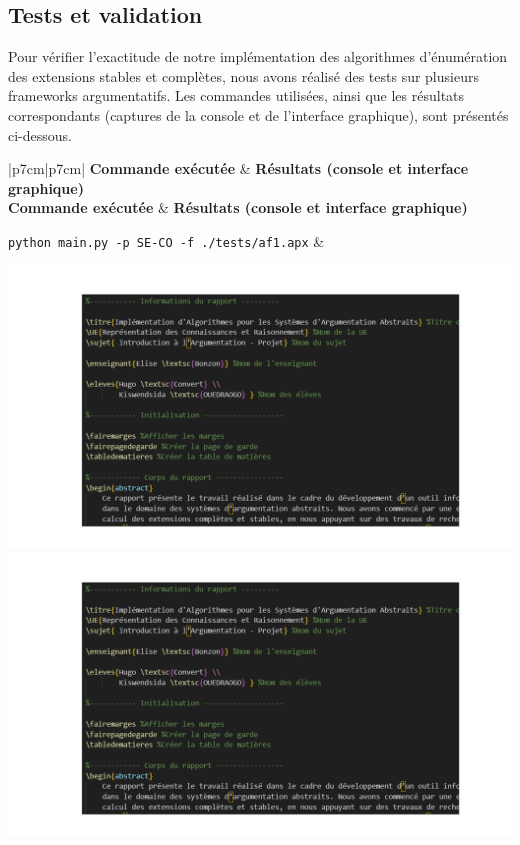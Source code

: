 \documentclass{rapportECL}
\begin{document}
\subsection{Tests et validation}

Pour vérifier l'exactitude de notre implémentation des algorithmes d'énumération des extensions stables et complètes, nous avons réalisé des tests sur plusieurs frameworks argumentatifs. Les commandes utilisées, ainsi que les résultats correspondants (captures de la console et de l'interface graphique), sont présentés ci-dessous.

\vspace{0.5cm}
\noindent


\begin{longtable}{|p{7cm}|p{7cm}|}
	\hline
	\textbf{Commande exécutée} & \textbf{Résultats (console et interface graphique)} \\ 
	\hline
	\endfirsthead
	\hline
	\textbf{Commande exécutée} & \textbf{Résultats (console et interface graphique)} \\ 
	\hline
	\endhead
	\hline
	\endfoot
	

	\texttt{python main.py -p SE-CO -f ./tests/af1.apx} & 
	\begin{minipage}{\linewidth}
		\centering
		\includegraphics[width=\linewidth]{img/console_af1.png} \\[0.2cm]
		\includegraphics[width=\linewidth]{img/console_af1.png}
	\end{minipage} \\[0.2cm]



\end{longtable}
\end{document}
